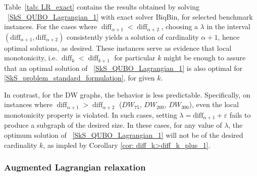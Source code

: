 \documentclass{article}
\DeclareMathOperator{\diff}{diff}
\newcommand{\Omkar}[1]{{\color{teal}#1}}
\begin{document}
% 
% 

Table~\ref{tab: LR_exact} contains the results obtained by solving ~\eqref{SkS_QUBO_Lagrangian_1} with exact solver BiqBin, for selected benchmark instances. For the cases where $\diff_{\alpha+1} < \diff_{\alpha+2}$, choosing a $\lambda$ in the interval $(\text{diff}_{\alpha+1}, \text{diff}_{\alpha+2})$ consistently yields a solution of cardinality $\alpha + 1$, hence optimal solutions, as desired. These instances serve as evidence that local monotonicity, i.e. $\diff_k <\diff_{k+1}$ for particular $k$ might be enough to assure that an optimal solution of ~\eqref{SkS_QUBO_Lagrangian_1} is also optimal  for \ref{SkS_problem_standard_formulation}, for given $k$.


In contrast, for the  DW graphs, the behavior is less predictable. Specifically, on instances where $\diff_{\alpha+1} > \diff_{\alpha+2}$ ($DW_{75}$, $DW_{200}$, $DW_{300}$), even the local monotonicity property  is violated. In such cases, setting $\lambda = \text{diff}_{\alpha+1} + \varepsilon$ fails to produce a subgraph of the desired size. In these cases, for any value of $\lambda$, the optimum solution of ~\eqref{SkS_QUBO_Lagrangian_1} will not be of the desired cardinality $k$, as impled by Corollary \ref{cor: diff_k>diff_k_plus_1}.




\subsubsection{Augmented Lagrangian relaxation}
\end{document}
